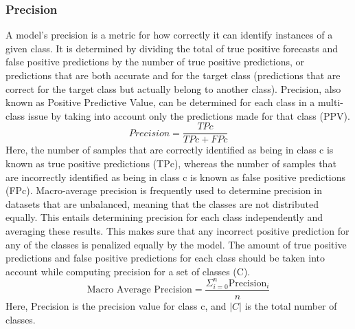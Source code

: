 \subsubsection{Precision}
A model's precision is a metric for how correctly it can identify instances of a given class.
It is determined by dividing the total of true positive forecasts and false positive predictions by the number of true positive predictions, or predictions that are both accurate and for the target class (predictions that are correct for the target class but actually belong to another class).
Precision, also known as Positive Predictive Value, can be determined for each class in a multi-class issue by taking into account only the predictions made for that class (PPV). 
\begin{equation}
    Precision = \frac{TPc}{TPc + FPc}
\end{equation}
Here, the number of samples that are correctly identified as being in class c is known as true positive predictions (TPc), whereas the number of samples that are incorrectly identified as being in class c is known as false positive predictions (FPc).
Macro-average precision is frequently used to determine precision in datasets that are unbalanced, meaning that the classes are not distributed equally.
This entails determining precision for each class independently and averaging these results.
This makes sure that any incorrect positive prediction for any of the classes is penalized equally by the model.
The amount of true positive predictions and false positive predictions for each class should be taken into account while computing precision for a set of classes (C). 
\begin{equation}
    \text{Macro Average Precision} = \frac{\Sigma_{i=0}^{n} \text{Precision}_i}{n}
\end{equation}
Here, Precision is the precision value for class c, and \(|C|\) is the total number of classes.

